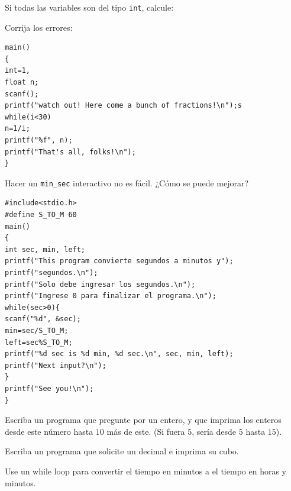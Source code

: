 \documentclass[spanish,addpoints,answers,a4paper]{exam}
\begin{document}
\begin{questions}

\question  Si todas las variables son del tipo \texttt{int}, calcule:


\question Corrija los errores:

\begin{verbatim}
main()
{
int=1,
float n;
scanf();
printf("watch out! Here come a bunch of fractions!\n");s
while(i<30)
n=1/i;
printf("%f", n);
printf("That's all, folks!\n");
}
\end{verbatim}

\question Hacer un \texttt{min_sec} interactivo no es fácil. ¿Cómo se puede mejorar?

\begin{verbatim}
#include<stdio.h>
#define S_TO_M 60
main()
{
int sec, min, left;
printf("This program convierte segundos a minutos y");
printf("segundos.\n");
printf("Solo debe ingresar los segundos.\n");
printf("Ingrese 0 para finalizar el programa.\n");
while(sec>0){
scanf("%d", &sec);
min=sec/S_TO_M;
left=sec%S_TO_M;
printf("%d sec is %d min, %d sec.\n", sec, min, left);
printf("Next input?\n");
}
printf("See you!\n");
}
\end{verbatim}

\question Escriba un programa que pregunte por un entero, y que imprima los enteros desde este número hasta $10$ más de este. (Si fuera $5$, sería desde $5$ hasta $15$).

\question Escriba un programa que solicite un decimal e imprima su cubo.

\question Use un while loop para convertir el tiempo en minutos a el tiempo en horas y minutos.


\end{questions}
\end{document}

